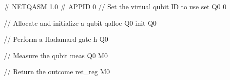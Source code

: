 \begin{nqcode}
  # NETQASM 1.0
  # APPID 0
  // Set the virtual qubit ID to use
  set Q0 0

  // Allocate and initialize a qubit
  qalloc Q0
  init Q0

  // Perform a Hadamard gate
  h Q0

  // Measure the qubit
  meas Q0 M0

  // Return the outcome
  ret_reg M0
\end{nqcode}




